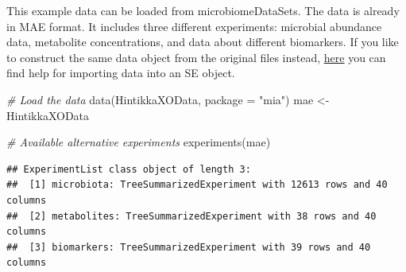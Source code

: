 \documentclass[
]{book}
\newenvironment{Shaded}{\begin{snugshade}}{\end{snugshade}}
\newcommand{\AttributeTok}[1]{\textcolor[rgb]{0.77,0.63,0.00}{#1}}
\newcommand{\CommentTok}[1]{\textcolor[rgb]{0.56,0.35,0.01}{\textit{#1}}}
\newcommand{\DecValTok}[1]{\textcolor[rgb]{0.00,0.00,0.81}{#1}}
\newcommand{\FunctionTok}[1]{\textcolor[rgb]{0.00,0.00,0.00}{#1}}
\newcommand{\NormalTok}[1]{#1}
\newcommand{\OtherTok}[1]{\textcolor[rgb]{0.56,0.35,0.01}{#1}}
\newcommand{\SpecialCharTok}[1]{\textcolor[rgb]{0.00,0.00,0.00}{#1}}
\newcommand{\StringTok}[1]{\textcolor[rgb]{0.31,0.60,0.02}{#1}}
\begin{document}
This example data can be loaded from microbiomeDataSets. The data is
already in MAE format. It includes three different experiments:
microbial abundance data, metabolite concentrations, and data about
different biomarkers. If you like to construct the same data object from the
original files instead, \href{https://microbiome.github.io/OMA/containers.html\#loading-experimental-microbiome-data}{here}
you can find help for importing data into an SE object.

\begin{Shaded}
\begin{Highlighting}[]
\CommentTok{\# Load the data}
\FunctionTok{data}\NormalTok{(HintikkaXOData, }\AttributeTok{package =} \StringTok{"mia"}\NormalTok{)}
\NormalTok{mae }\OtherTok{\textless{}{-}}\NormalTok{ HintikkaXOData}
\end{Highlighting}
\end{Shaded}

\begin{Shaded}
\end{Shaded}

\begin{Shaded}
\begin{Highlighting}[]
\CommentTok{\# Available alternative experiments}
\FunctionTok{experiments}\NormalTok{(mae)}
\end{Highlighting}
\end{Shaded}

\begin{verbatim}
## ExperimentList class object of length 3:
##  [1] microbiota: TreeSummarizedExperiment with 12613 rows and 40 columns
##  [2] metabolites: TreeSummarizedExperiment with 38 rows and 40 columns
##  [3] biomarkers: TreeSummarizedExperiment with 39 rows and 40 columns
\end{verbatim}
\end{document}
